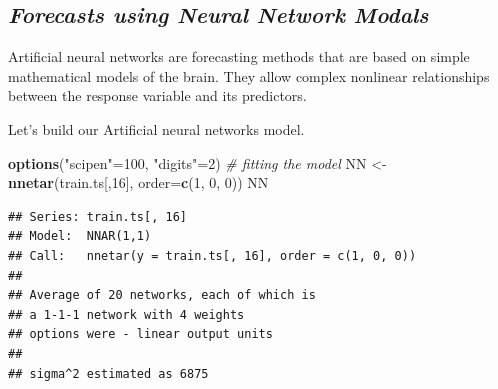 \documentclass[12pt,openany]{book}
\newenvironment{Shaded}{\begin{snugshade}}{\end{snugshade}}
\newcommand{\CommentTok}[1]{\textcolor[rgb]{0.56,0.35,0.01}{\textit{#1}}}
\newcommand{\DataTypeTok}[1]{\textcolor[rgb]{0.13,0.29,0.53}{#1}}
\newcommand{\DecValTok}[1]{\textcolor[rgb]{0.00,0.00,0.81}{#1}}
\newcommand{\KeywordTok}[1]{\textcolor[rgb]{0.13,0.29,0.53}{\textbf{#1}}}
\newcommand{\NormalTok}[1]{#1}
\newcommand{\StringTok}[1]{\textcolor[rgb]{0.31,0.60,0.02}{#1}}
\begin{document}
\hypertarget{forecasts-using-neural-network-modals-1}{%
\subsection{\texorpdfstring{\textbf{\emph{Forecasts using Neural Network Modals}}}{Forecasts using Neural Network Modals}}\label{forecasts-using-neural-network-modals-1}}

Artificial neural networks are forecasting methods that are based on simple mathematical models of the brain. They allow complex nonlinear relationships between the response variable and its predictors.

Let's build our Artificial neural networks model.

\begin{Shaded}
\begin{Highlighting}[]
\KeywordTok{options}\NormalTok{(}\StringTok{"scipen"}\NormalTok{=}\DecValTok{100}\NormalTok{, }\StringTok{"digits"}\NormalTok{=}\DecValTok{2}\NormalTok{)}
\CommentTok{# fitting the model}
\NormalTok{NN <-}\StringTok{ }\KeywordTok{nnetar}\NormalTok{(train.ts[,}\DecValTok{16}\NormalTok{], }\DataTypeTok{order=}\KeywordTok{c}\NormalTok{(}\DecValTok{1}\NormalTok{, }\DecValTok{0}\NormalTok{, }\DecValTok{0}\NormalTok{))}
\NormalTok{NN}
\end{Highlighting}
\end{Shaded}

\begin{verbatim}
## Series: train.ts[, 16] 
## Model:  NNAR(1,1) 
## Call:   nnetar(y = train.ts[, 16], order = c(1, 0, 0))
## 
## Average of 20 networks, each of which is
## a 1-1-1 network with 4 weights
## options were - linear output units 
## 
## sigma^2 estimated as 6875
\end{verbatim}
\end{document}

